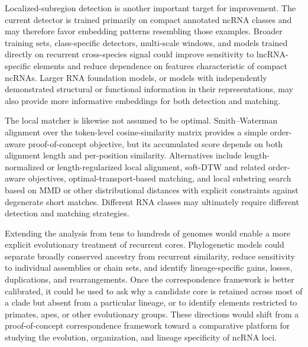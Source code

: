 Localized-subregion detection is another important target for improvement. The
current detector is trained primarily on compact annotated ncRNA classes and may
therefore favor embedding patterns resembling those examples. Broader training
sets, class-specific detectors, multi-scale windows, and models trained directly
on recurrent cross-species signal could improve sensitivity to lncRNA-specific
elements and reduce dependence on features characteristic of compact ncRNAs.
Larger RNA foundation models, or models with independently demonstrated
structural or functional information in their representations, may also provide
more informative embeddings for both detection and matching.

The local matcher is likewise not assumed to be optimal. Smith--Waterman
alignment over the token-level cosine-similarity matrix provides a simple
order-aware proof-of-concept objective, but its accumulated score depends on both
alignment length and per-position similarity. Alternatives include
length-normalized or length-regularized local alignment, soft-DTW and related
order-aware objectives, optimal-transport-based matching, and local substring
search based on MMD or other distributional distances with explicit constraints
against degenerate short matches. Different RNA classes may ultimately require
different detection and matching strategies.

Extending the analysis from tens to hundreds of genomes would enable a more
explicit evolutionary treatment of recurrent cores. Phylogenetic models could
separate broadly conserved ancestry from recurrent similarity, reduce sensitivity
to individual assemblies or chain sets, and identify lineage-specific gains,
losses, duplications, and rearrangements. Once the correspondence framework is
better calibrated, it could be used to ask why a candidate core is retained
across most of a clade but absent from a particular lineage, or to identify
elements restricted to primates, apes, or other evolutionary groups.
These directions would shift \curia{} from a proof-of-concept correspondence
framework toward a comparative platform for studying the evolution, organization,
and lineage specificity of ncRNA loci.
